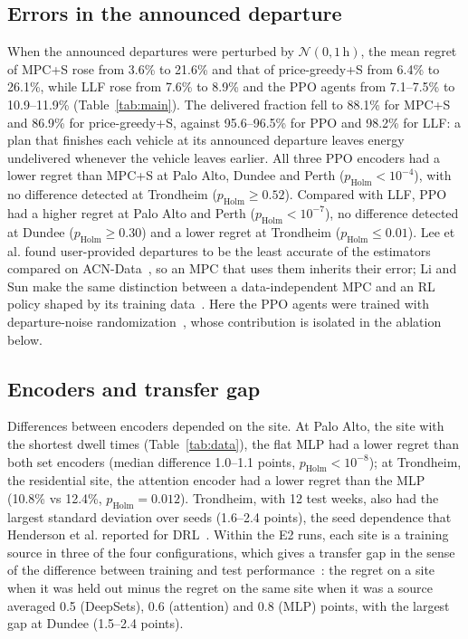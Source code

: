 \documentclass[conference]{IEEEtran}
\begin{document}
\subsection{Errors in the announced departure}
When the announced departures were perturbed by $\mathcal N(0,1\,\mathrm h)$, the mean regret of
MPC+S rose from 3.6\% to 21.6\% and that of price-greedy+S from 6.4\% to 26.1\%, while LLF rose from
7.6\% to 8.9\% and the PPO agents from 7.1--7.5\% to 10.9--11.9\% (Table~\ref{tab:main}). The
delivered fraction fell to 88.1\% for MPC+S and 86.9\% for price-greedy+S, against 95.6--96.5\% for
PPO and 98.2\% for LLF: a plan that finishes each vehicle at its announced departure leaves energy
undelivered whenever the vehicle leaves earlier.
All three PPO encoders had a lower regret than MPC+S at Palo Alto, Dundee and Perth
($p_\mathrm{Holm}<10^{-4}$), with no difference detected at Trondheim ($p_\mathrm{Holm}\ge0.52$). Compared
with LLF, PPO had a higher regret at Palo Alto and Perth ($p_\mathrm{Holm}<10^{-7}$), no difference
detected at Dundee ($p_\mathrm{Holm}\ge0.30$) and a lower regret at Trondheim ($p_\mathrm{Holm}\le0.01$).
Lee et al. found user-provided departures to be the least accurate of the estimators compared on
ACN-Data~\cite{lee2019acndata}, so an MPC that uses them inherits their error; Li and Sun make the
same distinction between a data-independent MPC and an RL policy shaped by its training
data~\cite{li2023ood}. Here the PPO agents were trained with departure-noise
randomization~\cite{tobin2017domain}, whose contribution is isolated in the ablation below.

\subsection{Encoders and transfer gap}
Differences between encoders depended on the site. At Palo Alto, the site with the shortest dwell
times (Table~\ref{tab:data}), the flat MLP had a lower regret than both set encoders (median
difference 1.0--1.1 points, $p_\mathrm{Holm}<10^{-8}$); at Trondheim, the residential site, the
attention encoder had a lower regret than the MLP (10.8\% vs 12.4\%, $p_\mathrm{Holm}=0.012$).
Trondheim, with 12 test weeks, also had the largest standard deviation over seeds (1.6--2.4 points),
the seed dependence that Henderson et al. reported for DRL~\cite{henderson2018matters}. Within the
E2 runs, each site is a training source in three of the four configurations, which gives a
transfer gap in the sense of the difference between training and test
performance~\cite{kirk2023survey}: the regret on a site when it was held out minus the regret on the same
site when it was a source averaged 0.5 (DeepSets), 0.6 (attention) and 0.8 (MLP) points, with the
largest gap at Dundee (1.5--2.4 points).
\end{document}
